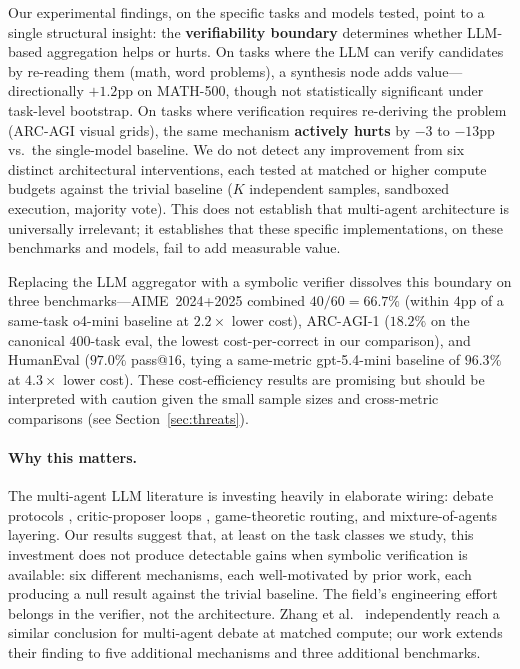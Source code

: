 \documentclass[11pt]{amsart}
\newcommand\1{{\mathds{1}}}
\theoremstyle{definition}
\theoremstyle{remark}
\numberwithin{equation}{section}
\begin{document}
Our experimental findings, on the specific tasks and models tested, point to a single structural insight: the \textbf{verifiability boundary} determines whether LLM-based aggregation helps or hurts.
On tasks where the LLM can verify candidates by re-reading them (math, word problems), a synthesis node adds value---directionally $+1.2$pp on MATH-500, though not statistically significant under task-level bootstrap.
On tasks where verification requires re-deriving the problem (ARC-AGI visual grids), the same mechanism \textbf{actively hurts} by $-3$ to $-13$pp vs.\ the single-model baseline.
We do not detect any improvement from six distinct architectural interventions, each tested at matched or higher compute budgets against the trivial baseline ($K$ independent samples, sandboxed execution, majority vote).
This does not establish that multi-agent architecture is universally irrelevant; it establishes that these specific implementations, on these benchmarks and models, fail to add measurable value.

Replacing the LLM aggregator with a symbolic verifier dissolves this boundary on three benchmarks---AIME~2024+2025 combined $40/60 = 66.7\%$ (within $4$pp of a same-task o4-mini baseline at $2.2\times$ lower cost), ARC-AGI-1 ($18.2\%$ on the canonical $400$-task eval, the lowest cost-per-correct in our comparison), and HumanEval ($97.0\%$ pass@$16$, tying a same-metric gpt-5.4-mini baseline of $96.3\%$ at $4.3\times$ lower cost).
These cost-efficiency results are promising but should be interpreted with caution given the small sample sizes and cross-metric comparisons (see Section~\ref{sec:threats}).

\paragraph{Why this matters.}
The multi-agent LLM literature is investing heavily in elaborate wiring: debate protocols \cite{Du2023Debate}, critic-proposer loops \cite{Shinn2023Reflexion, Madaan2023SelfRefine}, game-theoretic routing, and mixture-of-agents layering.
Our results suggest that, at least on the task classes we study, this investment does not produce detectable gains when symbolic verification is available: six different mechanisms, each well-motivated by prior work, each producing a null result against the trivial baseline.
The field's engineering effort belongs in the verifier, not the architecture.
Zhang et al.\ \cite{Zhang2025StopOvervaluingMAD} independently reach a similar conclusion for multi-agent debate at matched compute; our work extends their finding to five additional mechanisms and three additional benchmarks.
\end{document}
